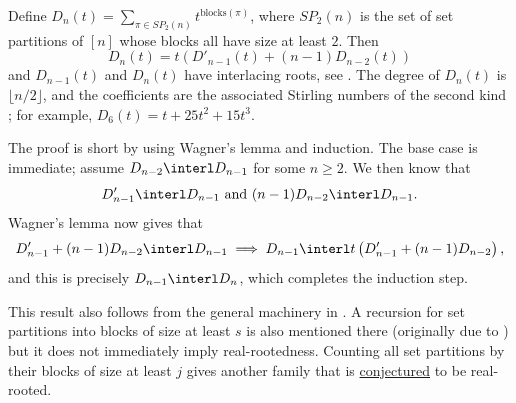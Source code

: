 \begin{example*}

Define \(D_n(t)=\sum_{\pi \in SP_2(n)} t^{\mathrm{blocks}(\pi)}\),
where $SP_2(n)$ is the set of set partitions of $[n]$ whose blocks all have
size at least $2$.
Then
\[
 D_n(t) = t\left( D'_{n-1}(t) + (n-1) D_{n-2}(t) \right)
\]
and $D_{n-1}(t)$ and $D_n(t)$ have interlacing roots, see
\cite[Thm.~1]{BonaHezo2016}.
The degree of $D_n(t)$ is $\lfloor n/2 \rfloor$, and the coefficients are
the associated Stirling numbers of the second kind ; for
example, $D_6(t)=t+25t^2+15t^3$.


The proof is short by using Wagner's lemma and induction.
The base case is immediate; assume $D_{n-2} \interl D_{n-1}$ for some
$n \geq 2$.
We then know that
\[
D'_{n-1} \interl D_{n-1} \text{ and } (n-1)D_{n-2} \interl D_{n-1}.
\]
Wagner's lemma now gives that
\[
D'_{n-1} + (n-1)D_{n-2} \interl D_{n-1}
\implies
D_{n-1} \interl t \left( D'_{n-1} + (n-1)D_{n-2} \right),
\]
and this is precisely $D_{n-1} \interl D_n$, which completes the induction step.

This result also follows from the general machinery in
\cite[Subsec.~3.4]{Hitczenko2024x}.
A recursion for set partitions into blocks of size at least $s$ is also mentioned
there (originally due to )
but it does not immediately imply real-rootedness.
Counting all set partitions by their blocks of size at least $j$ gives
another family that is \hyperref[conjBigBlocks]{conjectured} to be
real-rooted.

\end{example*}



